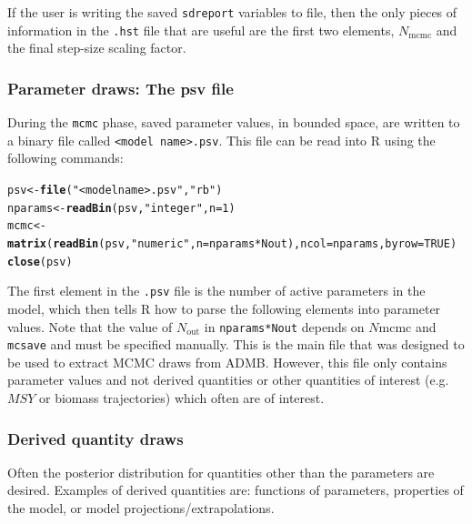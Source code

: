 \documentclass{article}\usepackage[]{graphicx}\usepackage[]{color}
\makeatletter
\newcommand{\hlnum}[1]{\textcolor[rgb]{0.686,0.059,0.569}{#1}}%
\newcommand{\hlstr}[1]{\textcolor[rgb]{0.192,0.494,0.8}{#1}}%
\newcommand{\hlopt}[1]{\textcolor[rgb]{0,0,0}{#1}}%
\newcommand{\hlstd}[1]{\textcolor[rgb]{0.345,0.345,0.345}{#1}}%
\newcommand{\hlkwb}[1]{\textcolor[rgb]{0.69,0.353,0.396}{#1}}%
\newcommand{\hlkwc}[1]{\textcolor[rgb]{0.333,0.667,0.333}{#1}}%
\newcommand{\hlkwd}[1]{\textcolor[rgb]{0.737,0.353,0.396}{\textbf{#1}}}%
\newenvironment{kframe}{%
 \def\at@end@of@kframe{}%
 \ifinner\ifhmode%
  \def\at@end@of@kframe{\end{minipage}}%
  \begin{minipage}{\columnwidth}%
 \fi\fi%
 \def\FrameCommand##1{\hskip\@totalleftmargin \hskip-\fboxsep
 \colorbox{shadecolor}{##1}\hskip-\fboxsep
     \hskip-\linewidth \hskip-\@totalleftmargin \hskip\columnwidth}%
 \MakeFramed {\advance\hsize-\width
   \@totalleftmargin\z@ \linewidth\hsize
   \@setminipage}}%
 {\par\unskip\endMakeFramed%
 \at@end@of@kframe}
\newenvironment{knitrout}{}{} %
\makeatother
\begin{document}
If the user is writing the saved \texttt{sdreport} variables to file, then the only
pieces of information in the \texttt{.hst} file that are useful are the first two
elements, $N_\text{mcmc}$ and the final step-size scaling factor.

\subsubsection{Parameter draws: The psv file}
During the \texttt{mcmc} phase, saved parameter values, in
bounded space, are written to a binary file called
\texttt{<model name>.psv}. This file can be read into R
using the following commands:
\begin{knitrout}
\color{fgcolor}\begin{kframe}
\begin{alltt}
\hlstd{psv} \hlkwb{<-} \hlkwd{file}\hlstd{(}\hlstr{"<model name>.psv"}\hlstd{,} \hlstr{"rb"}\hlstd{)}
\hlstd{nparams} \hlkwb{<-} \hlkwd{readBin}\hlstd{(psv,} \hlstr{"integer"}\hlstd{,} \hlkwc{n}\hlstd{=}\hlnum{1}\hlstd{)}
\hlstd{mcmc} \hlkwb{<-} \hlkwd{matrix}\hlstd{(}\hlkwd{readBin}\hlstd{(psv,} \hlstr{"numeric"}\hlstd{,} \hlkwc{n}\hlstd{=nparams}\hlopt{*}\hlstd{Nout),} \hlkwc{ncol}\hlstd{=nparams,} \hlkwc{byrow}\hlstd{=}\hlnum{TRUE}\hlstd{)}
\hlkwd{close}\hlstd{(psv)}
\end{alltt}
\end{kframe}
\end{knitrout}
The first element in the \texttt{.psv} file is the number of
active parameters in the model, which then tells R how to
parse the following elements into parameter values. Note
that the value of $N_\text{out}$ in \texttt{nparams*Nout} depends on
$N\text{mcmc}$ and \texttt{mcsave} and must be specified
manually. This is the main file that was designed to be used
to extract MCMC draws from ADMB. However, this file only
contains parameter values and not derived quantities or
other quantities of interest (e.g.\ $MSY$ or biomass
trajectories) which often are of interest.
\subsubsection{Derived quantity draws}\label{sec:derived.quantities}
Often the posterior distribution for quantities other than
the parameters are desired. Examples of derived quantities
are: functions of parameters, properties of the model, or
model projections/extrapolations.
\end{document}
